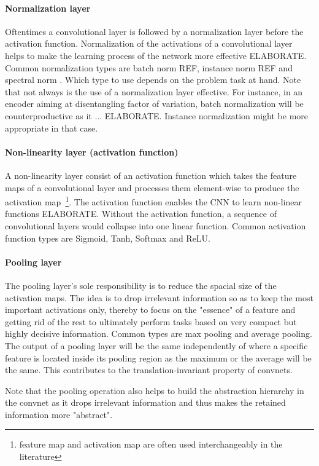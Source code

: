\documentclass[12pt,a4paper]{article}
\begin{document}
\paragraph{Normalization layer      } Oftentimes a convolutional layer is followed by a normalization layer before the activation function. Normalization of the activations of a convolutional layer helps to make the learning process of the network more effective ELABORATE. Common normalization types are batch norm REF, instance norm REF and spectral norm \cite{SNGAN}. Which type to use depends on the problem task at hand. Note that not always is the use of a normalization layer effective. For instance, in an encoder aiming at disentangling factor of variation, batch normalization will be counterproductive as it ... ELABORATE. Instance normalization might be more appropriate in that case.

\paragraph{Non-linearity layer (activation function)} A non-linearity layer consist of an activation function which takes the feature maps of a convolutional layer and processes them element-wise to produce the activation map~\footnote{feature map and activation map are often used interchangeably in the literature}. The activation function enables the CNN to learn non-linear functions ELABORATE. Without the activation function, a sequence of convolutional layers would collapse into one linear function. Common activation function types are Sigmoid, Tanh, Softmax and ReLU. 

\paragraph{Pooling layer            } The pooling layer's sole responsibility is to reduce the spacial size of the activation maps. The idea is to drop irrelevant information so as to keep the most important activations only, thereby to focus on the "essence" of a feature and getting rid of the rest to ultimately perform tasks based on very compact but highly decisive information. Common types are max pooling and average pooling. The output of a pooling layer will be the same independently of where a specific feature is located inside its pooling region as the maximum or the average will be the same. This contributes to the translation-invariant property of convnets.
\par Note that the pooling operation also helps to build the abstraction hierarchy in the convnet as it drops irrelevant information and thus makes the retained information more "abstract". 
\end{document}
